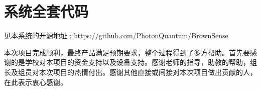 \documentclass[degree=course]{sjtuthesis}
\begin{document}
\appendix
\chapter{系统全套代码}
见本系统的开源地址 : \url{https://github.com/PhotonQuantum/BrownSense}

\backmatter
\begin{acknowledgements}
本次项目完成顺利，最终产品满足预期要求，整个过程得到了多方帮助。首先要感谢的是学校对本项目的资金支持以及设备支持。感谢老师的指导，助教的帮助，组长及组员对本次项目的热情付出。感谢其他直接或间接对本次项目做出贡献的人，在此表示衷心感谢。
\end{acknowledgements}
\end{document}
